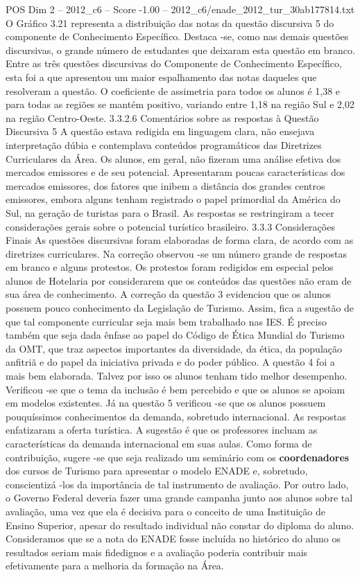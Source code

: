 \begin{textsample}{POS Dim 2 – 2012\_c6 – Score -1.00 – 2012\_c6/enade\_2012\_tur\_30ab177814.txt}
O Gráfico 3.21 representa a distribuição das notas da questão discursiva 5 do componente de Conhecimento Específico.
Destaca -se, como nas demais questões discursivas, o grande número de estudantes que deixaram esta questão em branco.
Entre as três questões discursivas do Componente de Conhecimento Específico, esta foi a que apresentou um maior espalhamento das notas daqueles que resolveram a questão.
O coeficiente de assimetria para todos os alunos é 1,38 e para todas as regiões se mantém positivo, variando entre 1,18 na região Sul e 2,02 na região Centro-Oeste. 3.3.2.6 Comentários sobre as respostas à Questão Discursiva 5 A questão estava redigida em linguagem clara, não ensejava interpretação dúbia e contemplava conteúdos programáticos das Diretrizes Curriculares da Área.
Os alunos, em geral, não fizeram uma análise efetiva dos mercados emissores e de seu potencial.
Apresentaram poucas características dos mercados emissores, dos fatores que inibem a distância dos grandes centros emissores, embora alguns tenham registrado o papel primordial da América do Sul, na geração de turistas para o Brasil.
As respostas se restringiram a tecer considerações gerais sobre o potencial turístico brasileiro. 3.3.3 Considerações Finais As questões discursivas foram elaboradas de forma clara, de acordo com as diretrizes curriculares.
Na correção observou -se um número grande de respostas em branco e alguns protestos.
Os protestos foram redigidos em especial pelos alunos de Hotelaria por considerarem que os conteúdos das questões não eram de sua área de conhecimento.
A correção da questão 3 evidenciou que os alunos possuem pouco conhecimento da Legislação de Turismo.
Assim, fica a sugestão de que tal componente curricular seja mais bem trabalhado nas IES.
É preciso também que seja dada ênfase ao papel do Código de Ética Mundial do Turismo da OMT, que traz aspectos importantes da diversidade, da ética, da população anfitriã e do papel da iniciativa privada e do poder público.
A questão 4 foi a mais bem elaborada.
Talvez por isso os alunos tenham tido melhor desempenho.
Verificou -se que o tema da inclusão é bem percebido e que os alunos se apoiam em modelos existentes.
Já na questão 5 verificou -se que os alunos possuem pouquíssimos conhecimentos da demanda, sobretudo internacional.
As respostas enfatizaram a oferta turística.
A sugestão é que os professores incluam as características da demanda internacional em suas aulas.
Como forma de contribuição, sugere -se que seja realizado um seminário com os \textbf{coordenadores} dos cursos de Turismo para apresentar o modelo ENADE e, sobretudo, conscientizá -los da importância de tal instrumento de avaliação.
Por outro lado, o Governo Federal deveria fazer uma grande campanha junto aos alunos sobre tal avaliação, uma vez que ela é decisiva para o conceito de uma Instituição de Ensino Superior, apesar do resultado individual não constar do diploma do aluno.
Consideramos que se a nota do ENADE fosse incluída no histórico do aluno os resultados seriam mais fidedignos e a avaliação poderia contribuir mais efetivamente para a melhoria da formação na Área.

\end{textsample}
